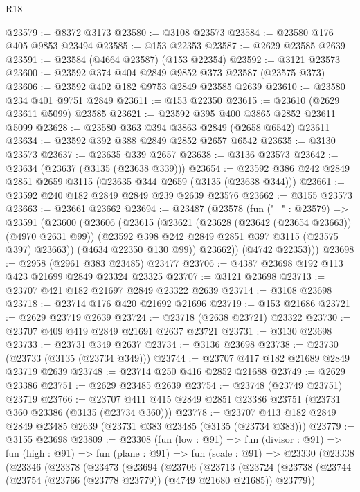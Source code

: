 \begin{lexlean}{R18}
\begin{coremodule}
@23579 := @8372 @3173
@23580 := @3108 @23573
@23584 := @23580 @176 @405 @9853 @23494
@23585 := @153 @22353
@23587 := @2629 @23585 @2639
@23591 := @23584 (@4664 @23587) (@153 @22354)
@23592 := @3121 @23573
@23600 := @23592 @374 @404 @2849 @9852 @373 @23587 (@23575 @373)
@23606 := @23592 @402 @182 @9753 @2849 @23585 @2639
@23610 := @23580 @234 @401 @9751 @2849
@23611 := @153 @22350
@23615 := @23610 (@2629 @23611 @5099) @23585
@23621 := @23592 @395 @400 @3865 @2852 @23611 @5099
@23628 := @23580 @363 @394 @3863 @2849 (@2658 @6542) @23611
@23634 := @23592 @392 @388 @2849 @2852 @2657 @6542
@23635 := @3130 @23573
@23637 := @23635 @339 @2657
@23638 := @3136 @23573
@23642 := @23634 (@23637 (@3135 (@23638 @339)))
@23654 := @23592 @386 @242 @2849 @2851 @2659 @3115 (@23635 @344 @2659 (@3135 (@23638 @344)))
@23661 := @23592 @240 @182 @2849 @2849 @239 @2639 @23576
@23662 := @3155 @23573
@23663 := @23661 @23662
@23694 := @23487
    (@23578
      (fun ("_" : @23579) =>
      @23591
        (@23600
          (@23606
            (@23615
              (@23621
                (@23628 (@23642 (@23654 @23663)) (@4970 @2631 @99))
                (@23592 @398 @242 @2849 @2851 @397 @3115 (@23575 @397) @23663))
              (@4634 @22350 @130 @99))
            @23662))
        (@4742 @22353)))
@23698 := @2958 (@2961 @383 @23485) @23477
@23706 := @4387 @23698 @192 @113 @423 @21699 @2849 @23324 @23325
@23707 := @3121 @23698
@23713 := @23707 @421 @182 @21697 @2849 @23322 @2639
@23714 := @3108 @23698
@23718 := @23714 @176 @420 @21692 @21696
@23719 := @153 @21686
@23721 := @2629 @23719 @2639
@23724 := @23718 (@2638 @23721) @23322
@23730 := @23707 @409 @419 @2849 @21691 @2637 @23721
@23731 := @3130 @23698
@23733 := @23731 @349 @2637
@23734 := @3136 @23698
@23738 := @23730 (@23733 (@3135 (@23734 @349)))
@23744 := @23707 @417 @182 @21689 @2849 @23719 @2639
@23748 := @23714 @250 @416 @2852 @21688
@23749 := @2629 @23386
@23751 := @2629 @23485 @2639
@23754 := @23748 (@23749 @23751) @23719
@23766 := @23707 @411 @415 @2849 @2851 @23386 @23751 (@23731 @360 @23386 (@3135 (@23734 @360)))
@23778 := @23707 @413 @182 @2849 @2849 @23485 @2639 (@23731 @383 @23485 (@3135 (@23734 @383)))
@23779 := @3155 @23698
@23809 := @23308
    (fun (low : @91) =>
    fun (divisor : @91) =>
    fun (high : @91) =>
    fun (plane : @91) =>
    fun (scale : @91) =>
    @23330
      (@23338
        (@23346
          (@23378
            (@23473
              (@23694
                (@23706
                  (@23713
                    (@23724
                      (@23738
                        (@23744 (@23754 (@23766 (@23778 @23779)) (@4749 @21680 @21685)) @23779))

\end{coremodule}
\end{lexlean}
